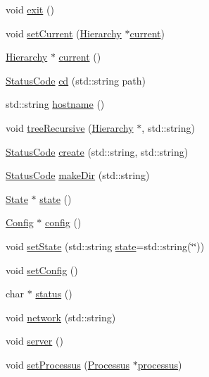 \begin{DoxyCompactItemize}
\item 
void \hyperlink{classApplication_a3c8a98d6c10a5b054800488df16cdbcb}{exit} ()
\item 
void \hyperlink{classApplication_a0f0a9e376d9f1716e01e86c94ae3499f}{set\+Current} (\hyperlink{classHierarchy}{Hierarchy} $\ast$\hyperlink{classApplication_af25c880ff1e95d863ed058396754a76e}{current})
\item 
\hyperlink{classHierarchy}{Hierarchy} $\ast$ \hyperlink{classApplication_af25c880ff1e95d863ed058396754a76e}{current} ()
\item 
\hyperlink{classStatusCode}{Status\+Code} \hyperlink{classApplication_a29aa0687ea27762ce36ab4195bf5d77f}{cd} (std\+::string path)
\item 
std\+::string \hyperlink{classApplication_a095248805e26b553466b7fafc6517d8f}{hostname} ()
\item 
void \hyperlink{classApplication_ab4a53c51303b155b738970bec9a6ce89}{tree\+Recursive} (\hyperlink{classHierarchy}{Hierarchy} $\ast$, std\+::string)
\item 
\hyperlink{classStatusCode}{Status\+Code} \hyperlink{classApplication_a552c6df459660f2d80e6d0ac6ce8279b}{create} (std\+::string, std\+::string)
\item 
\hyperlink{classStatusCode}{Status\+Code} \hyperlink{classApplication_accaba6b75f26c92e7604df43c853390b}{make\+Dir} (std\+::string)
\item 
\hyperlink{classState}{State} $\ast$ \hyperlink{classApplication_adfc9b92559f61c92224abf03f51cef47}{state} ()
\item 
\hyperlink{classConfig}{Config} $\ast$ \hyperlink{classApplication_ae79819f7743d6f402fce87665c1dc9a6}{config} ()
\item 
void \hyperlink{classApplication_a4a86c9bbf7851753c7b2bc03211092fb}{set\+State} (std\+::string \hyperlink{classApplication_adfc9b92559f61c92224abf03f51cef47}{state}=std\+::string(\char`\"{}\char`\"{}))
\item 
void \hyperlink{classApplication_a46614964f765fd5374b216582b599bcb}{set\+Config} ()
\item 
char $\ast$ \hyperlink{classApplication_ad429c4d2322f706e3564c1ee05d38ff1}{status} ()
\item 
void \hyperlink{classApplication_ab21cc0c86ca4e63d1fbd348d709dcddc}{network} (std\+::string)
\item 
void \hyperlink{classApplication_a1712ebe326b3d1855b839c59f52633d8}{server} ()
\item 
void \hyperlink{classApplication_a8ed8a66653bb6e665e05a735519c5d5b}{set\+Processus} (\hyperlink{classProcessus}{Processus} $\ast$\hyperlink{classApplication_a8d0918e800a5de01795bc2669d74ed82}{processus})

\end{DoxyCompactItemize}
